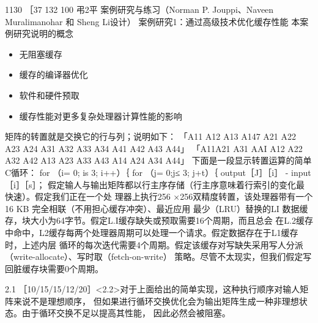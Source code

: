 1130
［37
132
100
弔2平
案例研究与练习（Norman P. Jouppi、Naveen Muralimanohar 和
Sheng Li设计）
案例研究1：通过高级技术优化缓存性能
本案例研究说明的概念
\begin{itemize}
    \item 无阻塞缓存
    \item 缓存的编译器优化
    \item 软件和硬件预取
    \item 缓存性能对更多复杂处理器计算性能的影响
\end{itemize}
矩阵的转置就是交换它的行与列；说明如下：
「A11 A12 A13 A147
A21 A22 A23 A24
A31 A32 A33 A34
A41 A42 A43 A44」
「A11A21 A31 AAI
A12 A22 A32 A42
A13
A23
A33
A43
A14 A24 A34 A44」
下面是一段显示转置运算的简单C循环：
for （i= 0; is 3; i++）｛
for （j= 0;j≤ 3; j+t）｛
output［J］［i］ - input［i］［s］；
假定输人与输出矩阵都以行主序存储（行主序意味着行索引的变化最快速）。假定我们正在一个处
理器上执行256 ×256双精度转置，该处理器带有一个16 KB 完全相联（不用担心缓存冲突）、最近应用
最少（LRU）替换的LI 数据缓存，块大小为64字节。假定L.I缓存缺失或预取需要16个周期，而且总会
在L.2缓存中命中，L2缓存每两个处理器周期可以处理一个请求。假定数据存在于L1缓存时，上述内层
循环的每次迭代需要4个周期。假定该缓存对写缺失采用写人分派（write-allocate）、写时取（fetch-on-write）
策略。尽管不太现实，但我们假定写回脏缓存块需要0个周期。

2.1 ［10/15/15/12/20］<2.2>对于上面给出的简单实现，这种执行顺序对输人矩阵来说不是理想顺序，
但如果进行循环交换优化会为输出矩阵生成一种非理想状态。由于循环交换不足以提高其性能，
因此必然会被阻塞。

